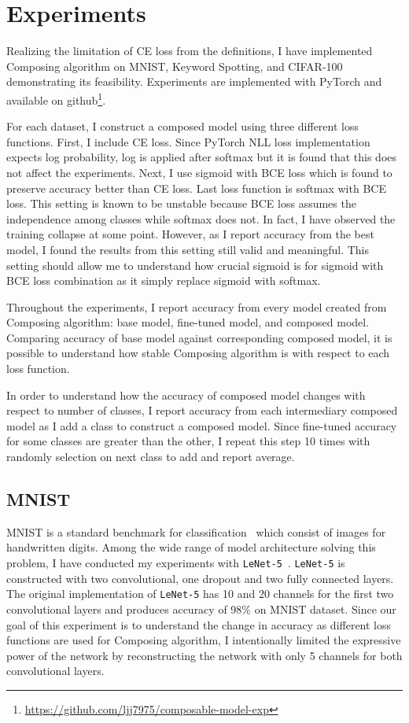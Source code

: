 \documentclass{article}
\begin{document}
\section{Experiments}

Realizing the limitation of CE loss from the definitions, I have implemented Composing algorithm on MNIST, Keyword Spotting, and CIFAR-100 demonstrating its feasibility. Experiments are implemented with PyTorch and available on github\footnote{\url{https://github.com/ljj7975/composable-model-exp}}.

For each dataset, I construct a composed model using three different loss functions. First, I include CE loss. Since PyTorch NLL loss implementation expects log probability, log is applied after softmax but it is found that this does not affect the experiments. Next, I use sigmoid with BCE loss which is found to preserve accuracy better than CE loss. Last loss function is softmax with BCE loss. This setting is known to be unstable because BCE loss assumes the independence among classes while softmax does not. In fact, I have observed the training collapse at some point. However, as I report accuracy from the best model, I found the results from this setting still valid and meaningful. This setting should allow me to understand how crucial sigmoid is for sigmoid with BCE loss combination as it simply replace sigmoid with softmax.

Throughout the experiments, I report accuracy from every model created from Composing algorithm: base model, fine-tuned model, and composed model. Comparing accuracy of base model against corresponding composed model, it is possible to understand how stable Composing algorithm is with respect to each loss function.

In order to understand how the accuracy of composed model changes with respect to number of classes, I report accuracy from each intermediary composed model as I add a class to construct a composed model. Since fine-tuned accuracy for some classes are greater than the other, I repeat this step 10 times with randomly selection on next class to add and report average.

\subsection{MNIST}

MNIST is a standard benchmark for classification~\cite{lecun1998gradient} which consist of images for handwritten digits. Among the wide range of model architecture solving this problem, I have conducted my experiments with \texttt{LeNet-5}~\cite{lecun2015lenet}. \texttt{LeNet-5} is constructed with two convolutional, one dropout and two fully connected layers. The original implementation of \texttt{LeNet-5} has 10 and 20 channels for the first two convolutional layers and produces accuracy of 98\% on MNIST dataset. Since our goal of this experiment is to understand the change in accuracy as different loss functions are used for Composing algorithm, I intentionally limited the expressive power of the network by reconstructing the network with only 5 channels for both convolutional layers.
\end{document}
